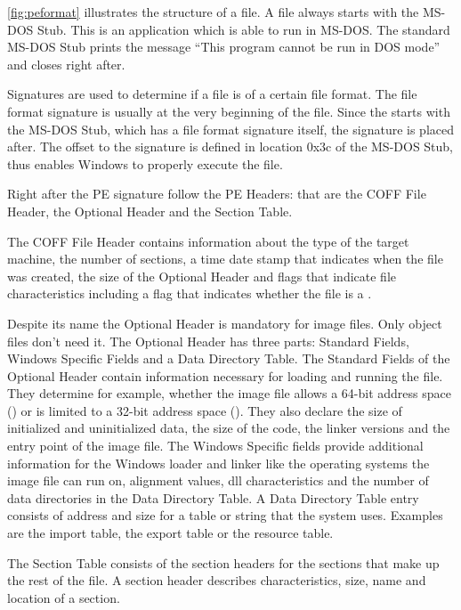 \autoref{fig:peformat} illustrates the structure of a \PE{} file. A \PE{} file always starts with the MS-DOS Stub. This is an application which is able to run in MS-DOS. The standard MS-DOS Stub prints the message \enquote{This program cannot be run in DOS mode} and closes right after. 

Signatures are used to determine if a file is of a certain file format. The file format signature is usually at the very beginning of the file. Since the \PE{} starts with the MS-DOS Stub, which has a file format signature itself, the \PE{} signature is placed after.  The offset to the \PE{} signature is defined in location 0x3c of the MS-DOS Stub, thus enables Windows to properly execute the \PE{} file. 

Right after the PE signature follow the PE Headers: that are the COFF File Header, the Optional Header and the Section Table. 

The COFF File Header contains information about the type of the target machine, the number of sections, a time date stamp that indicates when the file was created, the size of the Optional Header and flags that indicate file characteristics including a flag that indicates whether the file is a \DLL{}\label{dllflag}.

Despite its name the Optional Header is mandatory for image files. Only object files don't need it. The Optional Header has three parts: Standard Fields, Windows Specific Fields and a Data Directory Table.
The Standard Fields of the Optional Header contain information necessary for loading and running the file. They determine for example, whether the image file allows a 64-bit address space (\PEplus{}) or is limited to a 32-bit address space (\PEsmall{}). They also declare \ia{} the size of initialized and uninitialized data, the size of the code, the linker versions and the entry point of the image file.
The Windows Specific fields provide additional information for the Windows loader and linker like the operating systems the image file can run on, alignment values, dll characteristics and the number of data directories in the Data Directory Table.
A Data Directory Table entry consists of address and size for a table or string that the system uses. Examples are the import table, the export table or the resource table. 

The Section Table consists of the section headers for the sections that make up the rest of the \PE{} file. A section header describes \ia{} characteristics, size, name and location of a section.

